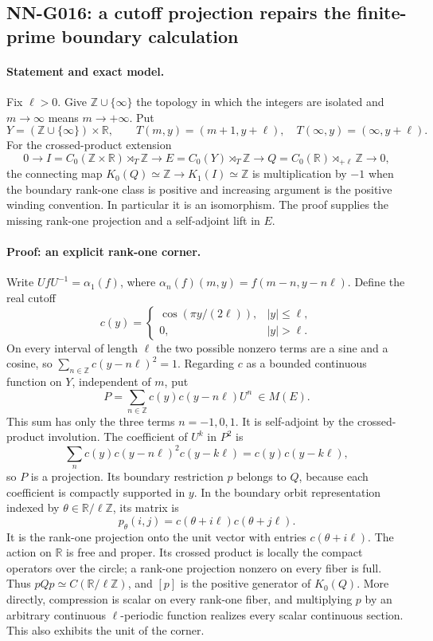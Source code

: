 \subsection{NN-G016: a cutoff projection repairs the finite-prime boundary calculation}
\paragraph{Statement and exact model.}
Fix $\ell>0$. Give $\mathbb Z\cup\{\infty\}$ the topology
in which the integers are isolated and $m\to\infty$ means
$m\to+\infty$. Put
\[
Y=(\mathbb Z\cup\{\infty\})\times\mathbb R,
\qquad T(m,y)=(m+1,y+\ell),\quad
T(\infty,y)=(\infty,y+\ell).
\]
For the crossed-product extension
\[
0\longrightarrow I=C_0(\mathbb Z\times\mathbb R)\rtimes_T\mathbb Z
\longrightarrow E=C_0(Y)\rtimes_T\mathbb Z
\longrightarrow Q=C_0(\mathbb R)\rtimes_{+\ell}\mathbb Z
\longrightarrow0,
\]
the connecting map $K_0(Q)\simeq\mathbb Z\to K_1(I)\simeq\mathbb Z$
is multiplication by $-1$ when the boundary rank-one class
is positive and increasing argument is the positive winding convention.
In particular it is an isomorphism. The proof supplies the
missing rank-one projection and a self-adjoint lift in $E$.

\paragraph{Proof: an explicit rank-one corner.}
Write $UfU^{-1}=\alpha_1(f)$, where
$\alpha_n(f)(m,y)=f(m-n,y-n\ell)$. Define the real cutoff
\[
c(y)=\begin{cases}\cos(\pi y/(2\ell)),& |y|\le\ell,\\0,&|y|>\ell.\end{cases}
\]
On every interval of length $\ell$ the two possible nonzero
terms are a sine and a cosine, so
$\sum_{n\in\mathbb Z}c(y-n\ell)^2=1$. Regarding $c$ as a
bounded continuous function on $Y$, independent of $m$, put
\[
P=\sum_{n\in\mathbb Z}c(y)c(y-n\ell)U^n\ \in M(E).
\]
This sum has only the three terms $n=-1,0,1$. It is
self-adjoint by the crossed-product involution. The coefficient
of $U^k$ in $P^2$ is
\[
\sum_n c(y)c(y-n\ell)^2c(y-k\ell)
=c(y)c(y-k\ell),
\]
so $P$ is a projection. Its boundary restriction $p$ belongs
to $Q$, because each coefficient is compactly supported in $y$.
In the boundary orbit representation indexed by
$\theta\in\mathbb R/\ell\mathbb Z$, its matrix is
\[
p_\theta(i,j)=c(\theta+i\ell)c(\theta+j\ell).
\]
It is the rank-one projection onto the unit vector with
entries $c(\theta+i\ell)$. The action on $\mathbb R$ is free
and proper. Its crossed product is locally the compact operators
over the circle; a rank-one projection nonzero on every fiber is
full. Thus $pQp\simeq C(\mathbb R/\ell\mathbb Z)$, and $[p]$
is the positive generator of $K_0(Q)$. More directly, compression
is scalar on every rank-one fiber, and multiplying $p$ by an
arbitrary continuous $\ell$-periodic function realizes every
scalar continuous section. This also exhibits the unit of the corner.

